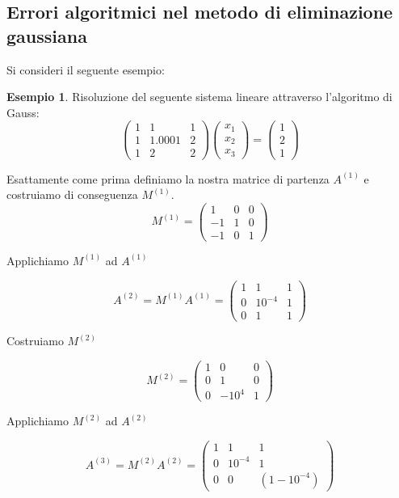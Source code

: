 \documentclass[12pt, a4paper]{book}
\theoremstyle{definition}
\newtheorem{exmp}{Esempio}[section]
\begin{document}
\subsection{Errori algoritmici nel metodo di eliminazione gaussiana}
\begin{flushleft}
Si consideri il seguente esempio: 

\begin{exmp}
Risoluzione del seguente sistema lineare attraverso l'algoritmo di Gauss:
\[ 	
	\begin{pmatrix}
		 1 & 1 & 1 \\
		 1 & 1.0001 & 2 \\
		 1 & 2 & 2 
	\end{pmatrix}
	\begin{pmatrix}
		x_{1} \\
		x_{2} \\
		x_{3}
	\end{pmatrix}
	= 
	\begin{pmatrix}
		1 \\
		2 \\
		1
	\end{pmatrix}
\]

Esattamente come prima definiamo la nostra matrice di partenza $A^{(1)}$ e costruiamo di conseguenza $M^{(1)}$.
\[ 	
	M^{(1)} = 
	\begin{pmatrix}
		 1 & 0 & 0 \\
		 -1 & 1 & 0 \\
		 -1 & 0 & 1 
	\end{pmatrix}
\]

Applichiamo $M^{(1)}$ ad $A^{(1)}$ 

\[ 	
	A^{(2)} = M^{(1)}A^{(1)}= 
	\begin{pmatrix}
		 1 & 1 & 1 \\
		 0 & 10^{-4} & 1 \\
		 0 & 1 & 1 
	\end{pmatrix}
\]

Costruiamo $M^{(2)}$

\[ 	
	M^{(2)} = 
	\begin{pmatrix}
		 1 & 0 & 0 \\
		 0 & 1 & 0 \\
		 0 & -10^{4} & 1 
	\end{pmatrix}
\]

Applichiamo $M^{(2)}$ ad $A^{(2)}$ 

\[ 	
	A^{(3)} = M^{(2)}A^{(2)}= 
	\begin{pmatrix}
		 1 & 1 & 1 \\
		 0 & 10^{-4} & 1 \\
		 0 & 0 & (1 - 10^{-4})
	\end{pmatrix}
\]


\end{exmp}
\end{flushleft}
\end{document}
